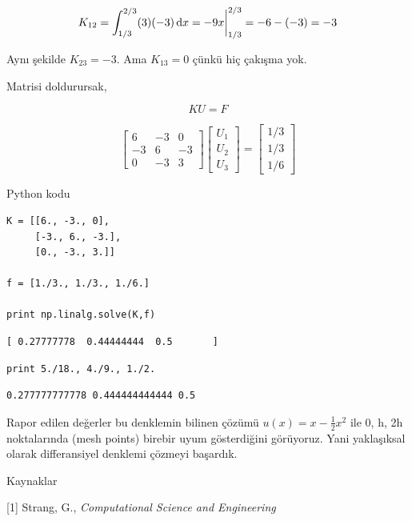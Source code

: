\documentclass[12pt,fleqn]{article}\usepackage{../../common}
\begin{document}
$$
K_{12} = \int_{1/3}^{2/3} (3)(-3) \,\mathrm{d} x
= -9x \bigg|_{1/3}^{2/3} = -6 - (-3) = -3
$$

Aynı şekilde $K_{23} = -3$. Ama $K_{13} = 0$ çünkü hiç çakışma yok.

Matrisi doldurursak, 

$$
KU = F
$$

$$ 
\left[\begin{array}{ccc}
    6 & -3 & 0 \\
    -3 & 6 & -3 \\
    0 & -3 & 3     
\end{array}\right]
\left[\begin{array}{c}
    U_1 \\
    U_2 \\
    U_3
\end{array}\right]
=
\left[\begin{array}{c}
    1/3 \\
    1/3 \\
    1/6
\end{array}\right]
$$

Python kodu 

\begin{verbatim}
K = [[6., -3., 0],
     [-3., 6., -3.],
     [0., -3., 3.]]

f = [1./3., 1./3., 1./6.]

print np.linalg.solve(K,f)
\end{verbatim}

\begin{verbatim}
[ 0.27777778  0.44444444  0.5       ]
\end{verbatim}

\begin{verbatim}
print 5./18., 4./9., 1./2.
\end{verbatim}

\begin{verbatim}
0.277777777778 0.444444444444 0.5
\end{verbatim}

Rapor edilen değerler bu denklemin bilinen çözümü $u(x) = x - \frac{1}{2}x^2$ 
ile 0, h, 2h noktalarında (mesh points) birebir uyum gösterdiğini
görüyoruz.  Yani yaklaşıksal olarak differansiyel denklemi çözmeyi 
başardık.

Kaynaklar

[1] Strang, G., {\em Computational Science and Engineering}
\end{document}

